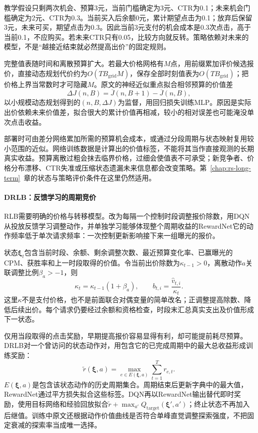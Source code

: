 教学假设只剩两次机会、预算3元，当前门槛确定为3元、CTR为0.1；未来机会门槛确定为2元、CTR为0.3。当前买入后余额0元，累计期望点击为0.1；放弃后保留3元，未来可买，期望点击为0.3。因此当前3元支付的机会成本是0.3次点击，高于当前0.1，不应购买。若未来CTR只有0.05，比较方向就反转。策略依赖对未来的模型，不是“越接近结束就必然提高出价”的固定规则。

完整值表随时间和离散预算扩大。若最大价格网格有$M$点，用前缀累加评价候选报价，直接动态规划代价约为$O(TB_{\mathrm{grid}}M)$，保存全部时刻值表为$O(TB_{\mathrm{grid}})$；把价格上界当常数时才可隐藏$M$。原文的神经近似重点拟合相邻预算的价值差
\[
  \Delta J(n,B)=\overline J(n,B+1)-\overline J(n,B),
\]
以小规模动态规划得到的$(n,B,\Delta J)$为监督，用回归损失训练MLP。原因是实际出价依赖未来价值差，拟合很大的累计价值再相减，较小的相对误差也可能淹没单次点击收益。

部署时可由差分网络累加所需的预算机会成本，或通过分段周期与状态映射复用较小范围的近似。网络训练数据是计算出的价值标签，不能将其当作直接观测的长期真实收益。预算离散过粗会抹去临界价格，过细会使值表不可承受；新竞争者、价格分布漂移、CTR失准或压缩状态遗漏未来信息都会改变策略。第~\ref{chap:rs-long-term}~章的状态与策略评价条件在这里仍然适用。

\paragraph{DRLB：反馈学习的周期竞价}
\label{sec:rs-advertising-drlb}

RLB需要明确的价格与转移模型。改为每隔一个控制时段调整报价除数，用DQN从投放反馈学习调整动作，并单独学习能够体现整个周期收益的RewardNet它的动作频率低于单次请求频率：一次控制更新影响接下来一组曝光的报价。

状态$\bm{\xi}_t$包含当前时段、余额、剩余调整次数、最近预算变化率、已赢曝光的CPM、获胜率和上一时段取得的价值。令当前出价除数为$\kappa_{t-1}>0$，离散动作$a$关联调整比例$\beta_a>-1$，则
\[
  \kappa_t=\kappa_{t-1}(1+\beta_a),\qquad
  b_{t,i}=\frac{\widehat v_{t,i}}{\kappa_t}.
\]
这里$\kappa$不是支付价格，也不是前面联合对偶变量的简单改名；正调整提高除数、降低后续出价。每个请求仍要经过余额和资格检查，时段末汇总真实支出及价值形成下一状态。

仅用当段取得的点击奖励，早期提高报价容易显得有利，却可能提前耗尽预算。DRLB对一个曾访问的状态动作对，用包含它的已完成周期中的最大总收益形成训练奖励：
\begin{equation}
  \widetilde r(\bm{\xi},a)
   =\max_{e\in E(\bm{\xi},a)}
      \sum_{t=1}^{T}r_{e,t}.
  \label{eq:rs-advertising-drlb-reward}
\end{equation}
$E(\bm{\xi},a)$是包含该状态动作的历史周期集合。周期结束后更新字典中的最大值，RewardNet通过平方损失拟合这些标签。DQN再以RewardNet输出替代即时奖励，使用目标网络和经验回放拟合$\widetilde r+\max_{a'}Q_{\mathrm{target}}(\bm{\xi}',a')$；终止状态不再加入后继值。训练中原文还根据动作价值曲线是否符合单峰直觉调整探索强度，不把固定衰减的探索率当成唯一选择。

